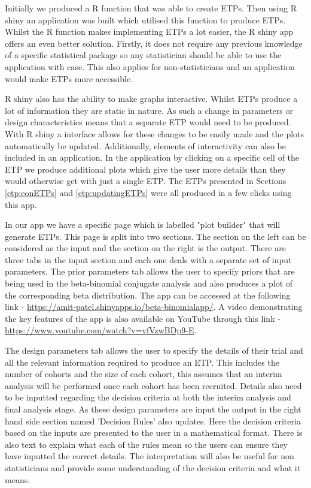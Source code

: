 Initially we produced a R function that was able to create ETPs. Then using R shiny an application was built which utilised this function to produce ETPs. Whilst the R function makes implementing ETPs a lot easier, the R shiny app offers an even better solution. Firstly, it does not require any previous knowledge of a specific statistical package so any statistician should be able to use the application with ease. This also applies for non-statisticians and an application would make ETPs more accessible.  

R shiny also has the ability to make graphs interactive. Whilst ETPs produce a lot of information they are static in nature. As such a change in parameters or design characteristics means that a separate ETP would need to be produced. With R shiny a interface allows for these changes to be easily made and the plots automatically be updated. Additionally, elements of interactivity can also be included in an application. In the application by clicking on a specific cell of the ETP we produce additional plots which give the user more details than they would otherwise get with just a single ETP. The ETPs presented in Sections \ref{etp:conETPs} and \ref{etp:updatingETPs} were all produced in a few clicks using this app. 

In our app we have a specific page which is labelled "plot builder" that will generate ETPs. This page is split into two sections. The section on the left can be considered as the input and the section on the right is the output. There are three tabs in the input section and each one deals with a separate set of input parameters. The prior parameters tab allows the user to specify priors that are being used in the beta-binomial conjugate analysis and also produces a plot of the corresponding beta distribution. The app can be accessed at the following link - \href{ https://amit-patel.shinyapps.io/beta-binomialapp/}{https://amit-patel.shinyapps.io/beta-binomialapp/}. A video demonstrating the key features of the app is also available on YouTube through this link - \href{ https://www.youtube.com/watch?v=vfVzwBDp9-E}{https://www.youtube.com/watch?v=vfVzwBDp9-E}.

The design parameters tab allows the user to specify the details of their trial and all the relevant information required to produce an ETP. This includes the number of cohorts and the size of each cohort, this assumes that an interim analysis will be performed once each cohort has been recruited. Details also need to be inputted regarding the decision criteria at both the interim analysis and final analysis stage. As these design parameters are input the output in the right hand side section named 'Decision Rules' also updates. Here the decision criteria based on the inputs are presented to the user in a mathematical format. There is also text to explain what each of the rules mean so the users can ensure they have inputted the correct details. The interpretation will also be useful for non statisticians and provide some understanding of the decision criteria and what it means.  

